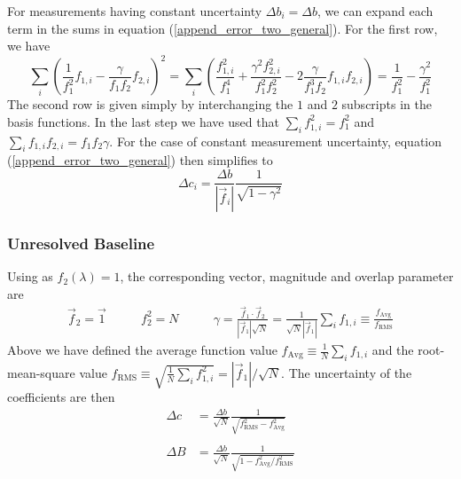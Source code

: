 For measurements having constant uncertainty $\Delta  b_i = \Delta  b$, we can expand each term in the sums in equation (\ref{append_error_two_general}). For the first row, we have
\begin{equation}
	\sum_i\left(\frac{1}{f_1^2}f_{1,i} - \frac{\gamma}{f_1f_2}f_{2,i}\right)^2 = \sum_i\left(\frac{f_{1,i}^2}{f_1^4} + \frac{\gamma^2f_{2,i}^2}{f_1^2f_2^2} - 2\frac{\gamma}{f_1^3f_2}f_{1,i}f_{2,i}\right) = \frac{1}{f_1^2} - \frac{\gamma^2}{f_1^2}
\end{equation}
The second row is given simply by interchanging the $1$ and $2$ subscripts in the basis functions. In the last step we have used that $\sum_i f_{1,i}^2 = f_1^2$ and $\sum_i f_{1,i}f_{2,i} = f_1f_2\gamma$. For the case of constant measurement uncertainty, equation (\ref{append_error_two_general}) then simplifies to
\begin{equation}\label{append_error_two_constUnc}
	\boxed{\Delta c_i = 
		\frac{\Delta  b}{\left|\vec f_i\right| }
		\frac{1}{\sqrt{1 - \gamma^2}}}
\end{equation}

\subsubsection{Unresolved Baseline}
Using as $f_2(\lambda) = 1$, the corresponding vector, magnitude and overlap parameter are
\begin{eqnarray}
	\vec{f}_2 = \vec{1} &\qquad
	f_2 ^2 = N &\qquad
	\gamma = \frac{\vec{f}_1 \cdot \vec{f}_2}{\left|\vec f_1\right|\sqrt{N}} = \frac{1}{\sqrt{N}\left|\vec f_1\right|}\sum_i f_{1,i} \equiv \frac{f_\mathrm{Avg}}{f_\mathrm{RMS}}
\end{eqnarray}
Above we have defined the average function value $f_\mathrm{Avg} \equiv \frac{1}{N}\sum_i f_{1,i}$ and the root-mean-square value $f_\mathrm{RMS} \equiv \sqrt{\frac{1}{N}\sum_i f_{1,i}^2} = \left|\vec f_1\right|/\sqrt{N}$.
The uncertainty of the coefficients are then
\begin{align}
	\Delta c &= \frac{\Delta b}{\sqrt{N}}\frac{1}{\sqrt{f_\mathrm{RMS}^2 - f_\mathrm{Avg}^2}} \\\nonumber\\
	\Delta B &= \frac{\Delta b}{\sqrt{N}}\frac{1}{\sqrt{1 - f_\mathrm{Avg}^2/f_\mathrm{RMS}^2}}
\end{align}

